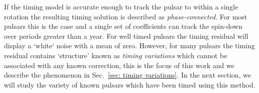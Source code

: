 If the timing model is accurate enough to track the pulsar to within a single
rotation the resulting timing solution is described as \emph{phase-connected}.
For most pulsars this is the case and a single set of coefficients can track
the spin-down over periods greater than a year. For well timed pulsars the
timing residual will display a `white` noise with a mean of zero. However, for
many pulsars the timing residual contains `structure' known as \emph{timing
variations} which cannot be associated with any known correction, this is the
focus of this work and we describe the phenomenon in Sec.~\ref{sec: timing
variations}. In the next section, we will study the variety of known pulsars
which have been timed using this method.


